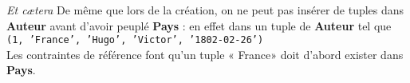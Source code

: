 \documentclass[10pt]{nsibeamer}
\begin{document}
\begin{frame}{\textit{Et c\ae tera}}
    De même que lors de la création, on ne peut pas insérer de tuples dans \textbf{Auteur} avant d'avoir peuplé \textbf{Pays} : en effet dans un tuple de \textbf{Auteur} tel que \\
    
    \texttt{(1, 'France', 'Hugo', 'Victor', '1802-02-26')}\\
    
    Les contraintes de référence font qu'un tuple « France» doit d'abord exister dans \textbf{Pays}.
\end{frame}
\end{document}
